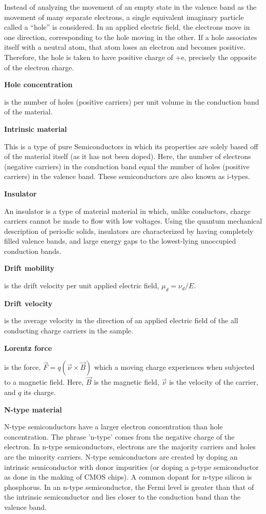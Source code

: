 \documentclass{../lab}
\begin{document}
Instead of analyzing the movement of an empty state in the valence band as the movement of many separate electrons, a single equivalent imaginary particle called a ``hole'' is considered. In an applied electric field, the electrons move in one direction, corresponding to the hole moving in the other. If a hole associates itself with a neutral atom, that atom loses an electron and becomes positive. Therefore, the hole is taken to have positive charge of +e, precisely the opposite of the electron charge.

\textbf{Hole concentration}

is the number of holes (positive carriers) per unit volume in the conduction band of the material.

\textbf{Intrinsic material}

This is a type of pure Semiconductors in which its properties are solely based off of the material itself (as it has not been doped). Here, the number of electrons (negative carriers) in the conduction band equal the number of holes (positive carriers) in the valence band. These semiconductors are also known as i-types.

\textbf{Insulator}

An insulator is a type of material material in which, unlike conductors, charge carriers cannot be made to flow with low voltages. Using the quantum mechanical description of periodic solids, insulators are characterized by having completely filled valence bands, and large energy gaps to the lowest-lying unoccupied conduction bands.

\textbf{Drift mobility}

is the drift velocity per unit applied electric field, $\mu_d = \nu_d/ E$.

\textbf{Drift velocity}

is the average velocity in the direction of an applied electric field of the all conducting charge carriers in the sample.

\textbf{Lorentz force}

is the force, $\vec{F} = q(\vec{\nu} \times \vec{B}) $ which a moving charge experiences when subjected to a magnetic field. Here, $\vec{B}$ is the magnetic field, $\vec{\nu}$ is the velocity of the carrier, and $q$ its charge.

\textbf{N-type material}

N-type semiconductors have a larger electron concentration than hole concentration. The phrase 'n-type' comes from the negative charge of the electron. In n-type semiconductors, electrons are the majority carriers and holes are the minority carriers. N-type semiconductors are created by doping an intrinsic semiconductor with donor impurities (or doping a p-type semiconductor as done in the making of CMOS chips). A common dopant for n-type silicon is phosphorus. In an n-type semiconductor, the Fermi level is greater than that of the intrinsic semiconductor and lies closer to the conduction band than the valence band.
\end{document}
